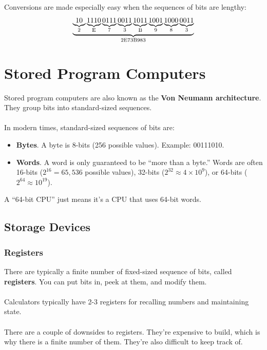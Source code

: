 \documentclass[]{article}
\theoremstyle{definition}
\begin{document}
			Conversions are made especially easy when the sequences of bits are lengthy:
			\begin{align*}
			  \underbrace{\underbrace{10}_{2} \underbrace{1110}_{\text E} \underbrace{0111}_{7} \underbrace{0011}_{3} \underbrace{1011}_{\text B} \underbrace{1001}_{9} \underbrace{1000}_{8} \underbrace{0011}_{3}}_{\text{2E73B983}}
			\end{align*}
	\section{Stored Program Computers}
		Stored program computers are also known as the \textbf{Von Neumann architecture}. They group bits into standard-sized sequences. 
		\\ \\
		In modern times, standard-sized sequences of bits are:
		\begin{itemize}
			\item \textbf{Bytes}. A byte is 8-bits (256 possible values). Example: 00111010.
			\item \textbf{Words}. A word is only guaranteed to be ``more than a byte.'' Words are often 16-bits ($2^{16} = 65,536$ possible values), 32-bits ($2^{32} \approx 4 \times 10^9$), or 64-bits ($2^{64} \approx 10^{19}$).
		\end{itemize}
		
		A ``64-bit CPU'' just means it's a CPU that uses 64-bit words. 
		
		\subsection{Storage Devices}
			\subsubsection{Registers}
				There are typically a finite number of fixed-sized sequence of bits, called \textbf{registers}. You can put bits in, peek at them, and modify them.
				\\ \\
				Calculators typically have 2-3 registers for recalling numbers and maintaining state.
				\\ \\
				There are a couple of downsides to registers. They're expensive to build, which is why there is a finite number of them. They're also difficult to keep track of.
\end{document}
